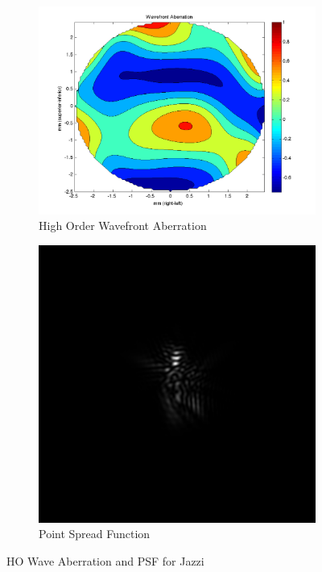 \documentclass{article}
\begin{document}
\begin{figure}[H]
\begin{subfigure}{.5\textwidth}
  \centering
  \includegraphics[width=1\linewidth]{Jazzi_WFA.png}
  \caption{High Order Wavefront Aberration}
  \label{fig:jazzihowa}
\end{subfigure}%
\begin{subfigure}{.5\textwidth}
  \centering
  \includegraphics[width=.8\linewidth]{Jazzi_PSF.png}
  \caption{Point Spread Function}
  \label{fig:jazzipsf}
\end{subfigure}
\caption{HO Wave Aberration and PSF for Jazzi}
\label{fig:jazzi}
\end{figure}
\end{document}
